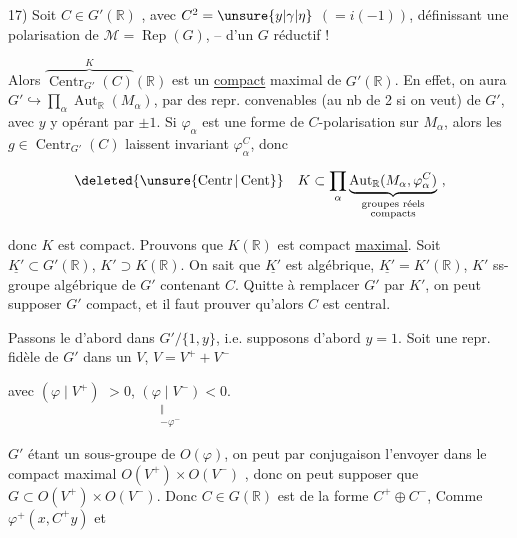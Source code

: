 
17) Soit $C\in G'(\mathbb R)$ \deleted{\unsure{$\varepsilon$}}, avec $C^2=\unsure{y|\gamma|\eta}$ $(=i(-1))$, définissant une polarisation de $\mathcal M=\operatorname{Rep}(G)$, -- d'un $G$ réductif !

Alors $\overbrace{\operatorname{Centr}_{G'}(C)}^{K}(\mathbb R)$ est un \uline{compact} maximal de $G'(\mathbb R)$. En effet, on  \deleted{\unsure{$\varphi$}} aura  $G'\hookrightarrow\prod_\alpha\operatorname{Aut}_{\mathbb R}(M_\alpha)$, par des repr. convenables (au nb de 2 si on veut) de $G'$,  avec $y$ y opérant par $\pm1$. Si $\varphi_\alpha$ est une forme de $C$-polarisation sur $M_\alpha$, alors les $g\in\operatorname{Centr}_{G'}(C)$ laissent invariant $\varphi_\alpha^C$, donc

\[
\deleted{\unsure{\operatorname{Centr}|\operatorname{Cent}}}\quad K\subset\prod_\alpha\underbrace{\operatorname{Aut}_{\mathbb R}(M_\alpha,\varphi_\alpha^C)}_{\substack{\text{groupes réels}\\\text{compacts}}}\ ,
\]

donc $K$ est  compact. Prouvons que  $K(\mathbb R)$ est compact \uline{maximal}. Soit  $\underline{K'}\subset G'(\mathbb R)$, $K'\supset K(\mathbb R)$. On sait que $\underline{K'}$ est algébrique, $\underline{K'}=K'(\mathbb R)$, $K'$ ss-groupe algébrique de $G'$ contenant $C$. Quitte à remplacer $G'$ par $K'$, on peut supposer $G'$ compact, et il faut prouver qu'alors $C$ est central.

Passons le d'abord dans $G'/\{1,y\}$, i.e. supposons d'abord $y=1$. Soit une repr. fidèle de $G'$ dans un $V$,    $V=V^++V^-$

 avec $(\varphi\mid V^+)$  $>0$, $\underset{\substack{\Vert\\-\varphi^-}}{(\varphi\mid V^-)}<0$.

\deleted{\unsure{$\varepsilon$}} $G'$ étant un sous-groupe  de $O(\varphi)$, on peut par conjugaison  l'envoyer dans le compact maximal $O(V^+)\times O(V^-)$ , donc on peut supposer que $G\subset O(V^+)\times O(V^-)$. Donc $C\in G(\mathbb R)$ est de la forme $C^+\oplus C^-$,  Comme $\varphi^+(x,C^+y)$ et

